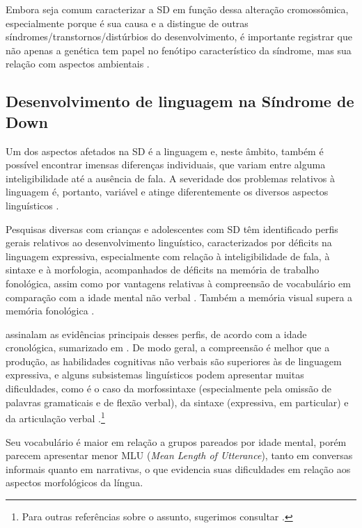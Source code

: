 \documentclass[output=paper,colorlinks,citecolor=brown,booklanguage=portuguese]{langscibook}
\begin{document}
Embora seja comum caracterizar a SD em função dessa alteração cromossômica, especialmente porque é sua causa e a distingue de outras síndromes/transtornos/distúrbios do desenvolvimento, é importante registrar que não apenas a genética tem papel no fenótipo característico da síndrome, mas sua relação com aspectos ambientais \citep{KarmiloffSmith1998, Bishop2004a, Sommer2008, KarmiloffSmith2016, Herault2017}.

\subsection{Desenvolvimento de linguagem na Síndrome de Down}

Um dos aspectos afetados na SD é a linguagem e, neste âmbito, também é possível encontrar imensas diferenças individuais, que variam entre alguma inteligibilidade até a ausência de fala. A severidade dos problemas relativos à linguagem é, portanto, variável e atinge diferentemente os diversos aspectos linguísticos \citep{Laws2004}.

Pesquisas diversas com crianças e adolescentes com SD têm identificado perfis gerais relativos ao desenvolvimento linguístico, caracterizados por déficits na linguagem expressiva, especialmente com relação à inteligibilidade de fala, à sintaxe e à morfologia, acompanhados de déficits na memória de trabalho fonológica, assim como por vantagens relativas à compreensão de vocabulário em comparação com a idade mental não verbal \citep{Chapman2000}. Também a memória visual supera a memória fonológica \citep{KarmiloffSmith2016}.

\citet{Chapman2001} assinalam as evidências principais desses perfis, de acordo com a idade cronológica, sumarizado em \citet{Lorandi2019}. De modo geral, a compreensão é melhor que a produção, as habilidades cognitivas não verbais são superiores às de linguagem expressiva, e alguns subsistemas linguísticos podem apresentar muitas dificuldades, como é o caso da morfossintaxe (especialmente pela omissão de palavras gramaticais e de flexão verbal), da sintaxe (expressiva, em particular) e da articulação verbal \citep{Chapman2000, Chapman2001, Laws2004}.\footnote{Para outras referências sobre o assunto, sugerimos consultar \citet{Lorandi2019}.}

Seu vocabulário é maior em relação a grupos pareados por idade mental, porém parecem apresentar menor MLU (\emph{Mean Length of Utterance}), tanto em conversas informais quanto em narrativas, o que evidencia suas dificuldades em relação aos aspectos morfológicos da língua.
\end{document}
